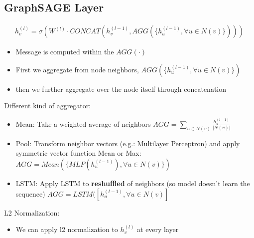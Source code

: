 \subsection{GraphSAGE Layer}
    \begin{align*}
        h_v^{(l)} = \sigma \left( W^{(l)} \cdot CONCAT\left(h_v^{(l-1)}, AGG(\{ h_u^{(l-1)}, \forall u\in N(v)  \})\right)  \right)
    \end{align*}
    \begin{itemize}
        \item Message is computed within the $AGG(\cdot)$
        \item First we aggregate from node neighbors, $AGG(\{ h_u^{(l-1)}, \forall u\in N(v)  \})$
        \item then we further aggregate over the node itself through concatenation 
    \end{itemize}
Different kind of aggregator: 
    \begin{itemize}
        \item Mean: Take a weighted average of neighbors $AGG = \sum_{u\in N(v)} \frac{h_u^{(l-1)}}{|N(v)|}$
        \item Pool: Transform neighbor vectors (e.g.: Multilayer Perceptron) and apply symmetric vector function Mean or Max: $AGG = Mean\left( \{ MLP(h_u^{(l-1)}), \forall u \in N(v)    \} \right)$
        \item LSTM: Apply LSTM to \textbf{reshuffled} of neighbors (so model doesn't learn the sequence) $AGG = LSTM([h_u^{(l-1)}, \forall u \in N(v)]$
    \end{itemize}

L2 Normalization: 
    \begin{itemize}
        \item We can apply l2 normalization to $h_v^{(l)}$ at every layer
    \end{itemize}
    
    
